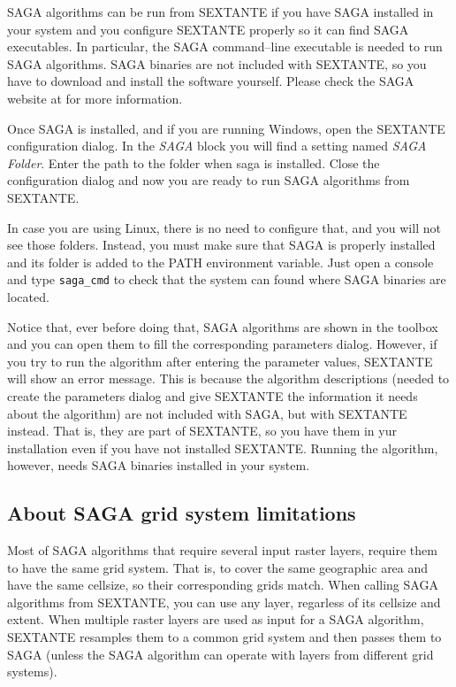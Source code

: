 SAGA algorithms can be run from SEXTANTE if you have SAGA installed in your system and you configure SEXTANTE properly so it can find SAGA executables. In particular, the SAGA command--line executable is needed to run SAGA algorithms. SAGA binaries are not included with SEXTANTE, so you have to download and install the software yourself. Please check the SAGA website at \texttt{} for more information.

Once SAGA is installed, and if you are running Windows, open the SEXTANTE configuration dialog. In the \emph{SAGA} block you will find a setting named \emph{SAGA Folder}. Enter the path to the folder when saga is installed. Close the configuration dialog and now you are ready to run SAGA algorithms from SEXTANTE.

In case you are using Linux, there is no need to configure that, and you will not see those folders. Instead, you must make sure that SAGA is properly installed and its folder is added to the PATH environment variable. Just open a console and type \texttt{saga\_cmd} to check that the system can found where SAGA binaries are located.

Notice that, ever before doing that, SAGA algorithms are shown in the toolbox and you can open them to fill the corresponding parameters dialog. However, if you try to run the algorithm after entering the parameter values, SEXTANTE will show an error message. This is because the algorithm descriptions (needed to create the parameters dialog and give SEXTANTE the information it needs about the algorithm) are not included with SAGA, but with SEXTANTE instead. That is, they are part of SEXTANTE, so you have them in yur installation even if you have not installed SEXTANTE. Running the algorithm, however, needs SAGA binaries installed in your system.

\subsection{About SAGA grid system limitations}

Most of SAGA algorithms that require several input raster layers, require them to have the same grid system. That is, to cover the same geographic area and have the same cellsize, so their corresponding grids match. When calling SAGA algorithms from SEXTANTE, you can use any layer, regarless of its cellsize and extent. When multiple raster layers are used as input for a SAGA algorithm, SEXTANTE resamples them to a common grid system and then passes them to SAGA (unless the SAGA algorithm can operate with layers from different grid systems).

